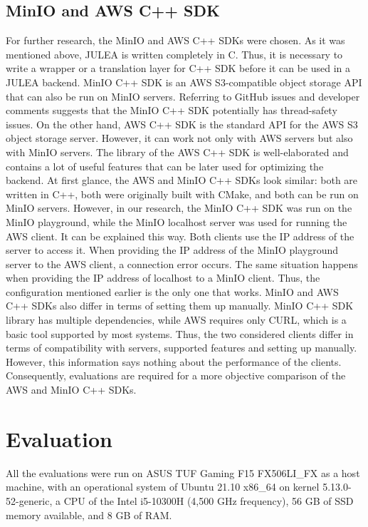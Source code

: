 \documentclass[conference]{IEEEtran}
\begin{document}
\subsection{MinIO and AWS C++ SDK}
For further research, the MinIO and AWS C++ SDKs were chosen. As it was mentioned above, JULEA is written completely in C. Thus, it is necessary to write a wrapper or a translation layer for C++ SDK before it can be used in a JULEA backend.
MinIO C++ SDK is an AWS S3-compatible object storage API that can also be run on MinIO servers. Referring to GitHub issues and developer comments suggests that the MinIO C++ SDK potentially has thread-safety issues. On the other hand, AWS C++ SDK is the standard API for the AWS S3 object storage server. However, it can work not only with AWS servers but also with MinIO servers. The library of the AWS C++ SDK is well-elaborated and contains a lot of useful features that can be later used for optimizing the backend. At first glance, the AWS and MinIO C++ SDKs look similar: both are written in C++, both were originally built with CMake, and both can be run on MinIO servers. However, in our research, the MinIO C++ SDK was run on the MinIO playground, while the MinIO localhost server was used for running the AWS client. It can be explained this way. Both clients use the IP address of the server to access it. When providing the IP address of the MinIO playground server to the AWS client, a connection error occurs. The same situation happens when providing the IP address of localhost to a MinIO client. Thus, the configuration mentioned earlier is the only one that works. MinIO and AWS C++ SDKs also differ in terms of setting them up manually. MinIO C++ SDK library has multiple dependencies, while AWS requires only CURL, which is a basic tool supported by most systems. Thus, the two considered clients differ in terms of compatibility with servers, supported features and setting up manually. However, this information says nothing about the performance of the clients. Consequently, evaluations are required for a more objective comparison of the AWS and MinIO C++ SDKs.

\section{Evaluation}
All the evaluations were run on ASUS TUF Gaming F15 FX506LI\_FX as a host machine, with an operational system of Ubuntu 21.10 x86\_64 on kernel 5.13.0-52-generic, a CPU of the Intel i5-10300H (4,500 GHz frequency), 56 GB of SSD memory available, and 8 GB of RAM.
\end{document}
